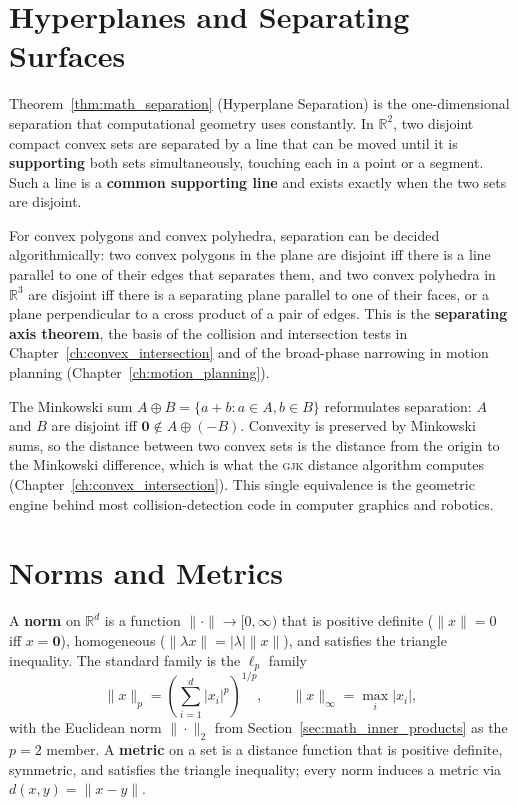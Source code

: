 \section{Hyperplanes and Separating Surfaces}
\label{sec:math_separating_surfaces}

Theorem~\ref{thm:math_separation} (Hyperplane Separation) is the
one-dimensional separation that computational geometry uses constantly. In
$\mathbb{R}^2$, two disjoint compact convex sets are separated by a line
that can be moved until it is \textbf{supporting} both sets simultaneously,
touching each in a point or a segment. Such a line is a \textbf{common
supporting line} and exists exactly when the two sets are disjoint.

For convex polygons and convex polyhedra, separation can be decided
algorithmically: two convex polygons in the plane are disjoint iff there is
a line parallel to one of their edges that separates them, and two convex
polyhedra in $\mathbb{R}^3$ are disjoint iff there is a separating plane
parallel to one of their faces, or a plane perpendicular to a cross product
of a pair of edges. This is the \textbf{separating axis theorem}, the basis
of the collision and intersection tests in Chapter~\ref{ch:convex_intersection}
and of the broad-phase narrowing in motion planning
(Chapter~\ref{ch:motion_planning}).

The Minkowski sum $A \oplus B = \{a + b : a\in A, b\in B\}$ reformulates
separation: $A$ and $B$ are disjoint iff $\mathbf{0} \notin A \oplus (-B)$.
Convexity is preserved by Minkowski sums, so the distance between two convex
sets is the distance from the origin to the Minkowski difference, which is
what the \textsc{gjk} distance algorithm computes
(Chapter~\ref{ch:convex_intersection}). This single equivalence is the
geometric engine behind most collision-detection code in computer graphics
and robotics.


\section{Norms and Metrics}
\label{sec:math_norms_metrics}

A \textbf{norm} on $\mathbb{R}^d$ is a function $\|\cdot\| \to
[0,\infty)$ that is positive definite ($\|x\|=0$ iff $x=\mathbf{0}$),
homogeneous ($\|\lambda x\| = |\lambda|\|x\|$), and satisfies the triangle
inequality. The standard family is the $\ell_p$ family
\[
  \|x\|_p = \left(\sum_{i=1}^d |x_i|^p\right)^{1/p}, \qquad
  \|x\|_\infty = \max_i |x_i|,
\]
with the Euclidean norm $\|\cdot\|_2$ from
Section~\ref{sec:math_inner_products} as the $p=2$ member. A \textbf{metric}
on a set is a distance function that is positive definite, symmetric, and
satisfies the triangle inequality; every norm induces a metric via
$d(x,y) = \|x-y\|$.

